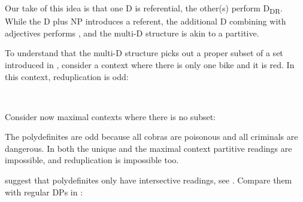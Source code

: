 \documentclass[output=paper,
modfonts
]{langscibook}
\begin{document}
Our take of this idea is that one D is referential, the other(s) perform D\textsubscript{DR}. While the D plus NP introduces a referent, the additional D combining with adjectives performs , and the multi-D structure is akin to a partitive.

To understand that the multi-D structure picks out a proper subset of a set introduced in , consider a  context where there is only one bike and it is red. In this context, reduplication is odd: \newpage 

\ea \label{ex:etxeberria:45}  \\
\z
\z 

Consider now maximal contexts where there is no subset:

\z

\z

The polydefinites are odd because all cobras are poisonous and all criminals are dangerous. In both the unique and the maximal context partitive readings are impossible, and reduplication is impossible too.

\citet{CamposStravrou2004} suggest that polydefinites only have intersective readings, see . Compare them with regular DPs in :
\end{document}
